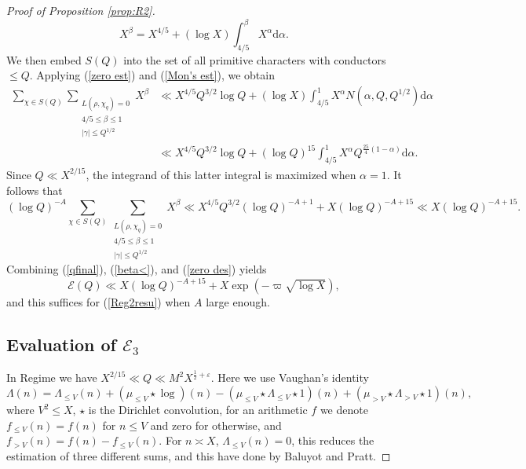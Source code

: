 \documentclass[12pt,reqno]{amsart}
\numberwithin{equation}{section}
\theoremstyle{plain}
\theoremstyle{definition}
\theoremstyle{remark}
\newcommand{\dd}{\mathrm{d}}
\begin{document}
\begin{proof}[Proof of Proposition \ref{prop:R2}]
\begin{equation*}
X^\beta=X^{4 / 5}+(\log X) \int_{4 / 5}^\beta X^\alpha \dd  \alpha.
\end{equation*}
We then embed $S(Q)$ into the set of all primitive characters with conductors $\leq Q$. Applying (\ref{zero est}) and (\ref{Mon's est}), we obtain
\begin{align*}
\sum_{\chi \in S(Q)} \sum_{\substack{L\left(\rho, \chi_q\right)=0 \\ 4 / 5 \leq \beta \leq 1 \\|\gamma| \leq Q^{1 / 2}}} X^\beta & \ll X^{4 / 5} Q^{3 / 2}\log Q+(\log X) \int_{4 / 5}^1 X^\alpha N\left(\alpha, Q, Q^{1 / 2}\right) \dd \alpha \\
& \ll X^{4 / 5} Q^{3 / 2}\log Q+ {(\log Q)}^{15}\int_{4 / 5}^1 X^\alpha Q^{\frac{25}{4}(1-\alpha)} \dd \alpha .
\end{align*}
Since $Q \ll X^{2 / 15}$, the integrand of this latter integral is maximized when $\alpha=1$. It follows that
\begin{equation}\label{qfinal}
{(\log Q)}^{-A}\sum_{\chi \in S(Q)} \sum_{\substack{L\left(\rho, \chi_q\right)=0 \\ 4 / 5 \leq \beta \leq 1 \\|\gamma| \leq Q^{1 / 2}}} X^\beta \ll X^{4 / 5} Q^{3 / 2}{(\log Q)}^{-A+1}+ X{(\log Q)}^{-A+15}\ll X{(\log Q)}^{-A+15}.
\end{equation}
Combining (\ref{qfinal}), (\ref{beta<}), and (\ref{zero des}) yields
\begin{equation*}
\mathcal{E}(Q) \ll X{(\log Q)}^{-A+15}+ X \exp (-\varpi \sqrt{\log X}),
\end{equation*}
and this suffices for (\ref{Reg2resu}) when $A$ large enough.


\subsection{Evaluation of $\mathcal{E}_3$}
In Regime \uppercase\expandafter{}
we have $X^{2/15}\ll Q\ll M^2X^{\frac{1}{2}+\varepsilon}$.
Here we use Vaughan's identity
\begin{equation*}\label{eqn:vaughan'sidentity}
  \Lambda(n)=\Lambda_{\leq V}(n)+
  (\mu_{\leq V}\star \log)(n)-
  (\mu_{\leq V}\star \Lambda_{\leq V}\star 1)(n)+
  (\mu_{> V}\star \Lambda_{> V}\star 1)(n),
\end{equation*}
where $V^2\leq X$, $\star$ is the Dirichlet convolution,
for an arithmetic $f$ we denote $f_{\leq V}(n)=f(n)$ for $n\leq V$ and zero for otherwise, and $f_{>V}(n)=f(n)-f_{\leq V}(n)$.
For $n\asymp X$, $\Lambda_{\leq V}(n)=0$, this reduces the estimation of three different sums, and this have done by Baluyot and Pratt\cite{BP22}.


\end{proof}
\end{document}
